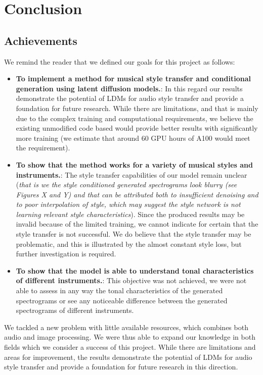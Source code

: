 \section{Conclusion}

\subsection{Achievements}

We remind the reader that we defined our goals for this project as follows:
\begin{itemize}
    \item \textbf{To implement a method for musical style transfer and conditional generation using latent diffusion models.}: In this regard our results demonstrate the potential of LDMs for audio style transfer and provide a foundation for future research. While there are limitations, and that is mainly due to the complex training and computational requirements, we believe the existing unmodified code based would provide better results with significantly more training (we estimate that around 60 GPU hours of A100 would meet the requirement).
    \item \textbf{To show that the method works for a variety of musical styles and instruments.}: The style transfer capabilities of our model remain unclear (\textit{that is we the style conditioned generated spectrograms look blurry (see Figures X and Y) and that can be attributed both to insufficient denoising and to poor interpolation of style, which may suggest the style network is not learning relevant style characteristics}). Since the produced results may be invalid because of the limited training, we cannot indicate for certain that the style transfer is not successful. We do believe that the style transfer may be problematic, and this is illustrated by the almost constant style loss, but further investigation is required.
    \item \textbf{To show that the model is able to understand tonal characteristics of different instruments.}: This objective was not achieved, we were not able to assess in any way the tonal characteristics of the generated spectrograms or see any noticeable difference between the generated spectrograms of different instruments.
\end{itemize}

\vspace{0.5cm}


\noindent We tackled a new problem with little available resources, which combines both audio and image processing. We were thus able to expand our knowledge in both fields which we consider a success of this project. While there are limitations and areas for improvement, the results demonstrate the potential of LDMs for audio style transfer and provide a foundation for future research in this direction. 

